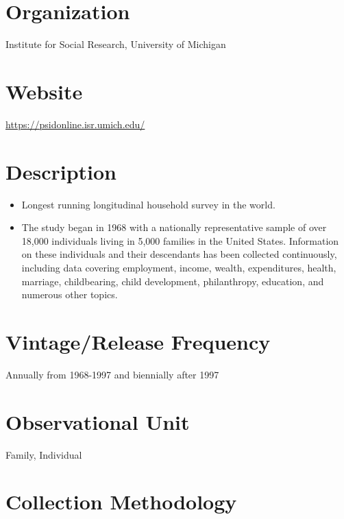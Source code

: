 \documentclass[
]{book}
\providecommand{\tightlist}{%
  \setlength{\itemsep}{0pt}\setlength{\parskip}{0pt}}
\begin{document}
\hypertarget{organization-71}{%
\section{Organization}\label{organization-71}}

Institute for Social Research, University of Michigan

\hypertarget{website-71}{%
\section{Website}\label{website-71}}

\url{https://psidonline.isr.umich.edu/}

\hypertarget{description-71}{%
\section{Description}\label{description-71}}

\begin{itemize}
\tightlist
\item
  Longest running longitudinal household survey in the world.
\item
  The study began in 1968 with a nationally representative sample of over 18,000 individuals living in 5,000 families in the United States. Information on these individuals and their descendants has been collected continuously, including data covering employment, income, wealth, expenditures, health, marriage, childbearing, child development, philanthropy, education, and numerous other topics.
\end{itemize}

\hypertarget{vintagerelease-frequency-71}{%
\section{Vintage/Release Frequency}\label{vintagerelease-frequency-71}}

Annually from 1968-1997 and biennially after 1997

\hypertarget{observational-unit-71}{%
\section{Observational Unit}\label{observational-unit-71}}

Family, Individual

\hypertarget{collection-methodology-71}{%
\section{Collection Methodology}\label{collection-methodology-71}}
\end{document}
